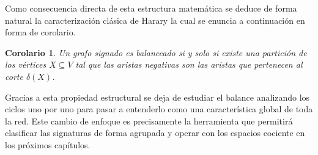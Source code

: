 \documentclass[11pt,a4paper,spanish]{report}
\theoremstyle{plain}
\newtheorem{corolario}[teorema]{Corolario}
\begin{document}
Como consecuencia directa de esta estructura matemática se deduce de forma natural la caracterización clásica de Harary la cual se enuncia a continuación en forma de corolario.

\begin{corolario}
\cite{harary1953notion} \label{caracterizacion_harary}
Un grafo signado es balanceado si y solo si existe una partición de los vértices $X \subseteq V$ tal que las aristas negativas son las aristas que pertenecen al corte $\delta(X)$.
\end{corolario}

Gracias a esta propiedad estructural se deja de estudiar el balance analizando los ciclos uno por uno para pasar a entenderlo como una característica global de toda la red. Este cambio de enfoque es precisamente la herramienta que permitirá clasificar las signaturas de forma agrupada y operar con los espacios cociente en los próximos capítulos.
\end{document}
